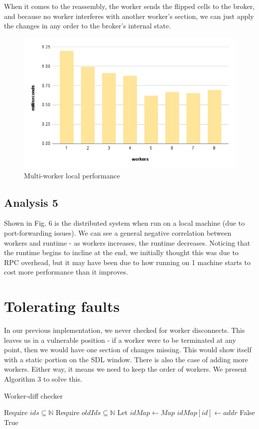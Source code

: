 \documentclass[twoside,twocolumn]{article}
\begin{document}
When it comes to the reassembly, the worker sends the flipped cells to the broker, and because no 
worker interferes with another worker's section, we can just apply the changes in any order to the broker's
internal state.
\begin{figure}
  \includegraphics[width=\linewidth]{multi-worker.png}
  \caption{Multi-worker local performance}
  \label{fig:chart6}
\end{figure}
\subsection{Analysis 5}
Shown in Fig. 6 is the distributed system when run on a local machine (due to port-forwarding issues).
We can see a general negative correlation between workers and runtime - as workers increases, the runtime decreases.
Noticing that the runtime begins to incline at the end, we initially thought this was due to RPC overhead, but it may have been
due to how running on 1 machine starts to cost more performance than it improves.

\section{Tolerating faults}
In our previous implementation, we never checked for worker disconnects. This leaves us in a vulnerable
position - if a worker were to be terminated at any point, then we would have one section of changes missing.
This would show itself with a static portion on the SDL window. There is also the case of adding more workers. Either
way, it means we need to keep the order of workers. We present Algorithm 3 to solve this.
\begin{algorithm}
  \caption{Worker-diff checker}
  \begin{algorithmic}
    \State Require $ids \subseteq \mathbb{N}$
    \State Require $oldIds \subseteq \mathbb{N}$ 
    \State Let $idMap \gets Map$
      \State $idMap[id] \gets addr$
    \EndFor
      \State \Return False
      \EndIf
    \EndFor
    \State \Return True
  \end{algorithmic}
\end{algorithm}
\end{document}
